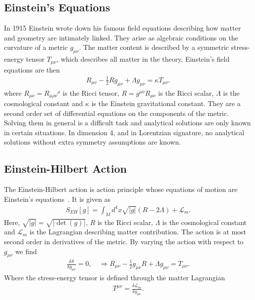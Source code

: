 \documentclass[10pt]{report}
\theoremstyle{definition}
\begin{document}
\subsection{Einstein's Equations}
In 1915 Einstein wrote down his famous field equations describing how matter and geometry are intimately linked. They arise as algebraic conditions on the curvature of a metric $g_{\mu\nu}$. The matter content is described by a symmetric stress-energy tensor $T_{\mu\nu}$, which describes all matter in the theory. Einstein's field equations are then 
\begin{align}
    R_{\mu\nu} - \frac{1}{2} R g_{\mu\nu} + \Lambda g_{\mu\nu} = \kappa T_{\mu\nu}. \label{eq:metric-einsteins-equation}
\end{align}
where $R_{\mu\nu} = R_{\mu\rho\nu}{}^\rho$ is the Ricci tensor, $R = g^{\mu\nu} R_{\mu\nu}$ is the Ricci scalar, $\Lambda$ is the cosmological constant and $\kappa$ is the Einstein gravitational constant. They are a second order set of differential equations on the components of the metric. Solving them in general is a difficult task and analytical solutions are only known in certain situations. In dimension 4, and in Lorentzian signature, no analytical solutions without extra symmetry assumptions are known.

\subsection{Einstein-Hilbert Action}
The Einstein-Hilbert action is action principle whose equations of motion are Einstein's equations~\cite{Hilbert1915}. It is given as 
\begin{align}
    S_{EH}[g] = \int_M d^4x \sqrt{|g|} (R - 2 \Lambda) + \mathcal{L}_m.
\end{align}
Here, $\sqrt{|g|} = \sqrt{|\det(g)|}$, $R$ is the Ricci scalar, $\Lambda$ is the cosmological constant and $\mathcal{L}_m$ is the Lagrangian describing matter contribution. The action is at most second order in derivatives of the metric. By varying the action with respect to $g_{\mu\nu}$ we find 
\begin{align}
    \frac{\delta S}{\delta g_{\mu\nu}} = 0, \quad \Rightarrow R_{\mu\nu} - \frac{1}{2}g_{\mu\nu}R + \Lambda g_{\mu\nu} = T_{\mu\nu}.
\end{align}
Where the stress-energy tensor is defined through the matter Lagrangian 
\begin{align}
    T^{\mu\nu} = \frac{\delta\mathcal{L}_m}{\delta g_{\mu\nu}}.
\end{align}
\end{document}
